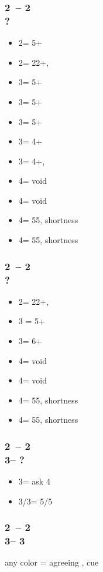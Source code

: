 \documentclass[12pt, a4paper]{article}
\begin{document}
\subsubsection*{2\clubs\ -- 2\hearts\\?}
\begin{itemize}
    \item 2\spades = 5+\spades
    \item 2\nt = 22+, \bal
    \item 3\clubs = 5+\clubs
    \item 3\diams = 5+\diams
    \item 3\hearts = 5+\hearts
    \item 3\spades = 4+\diams
    \item 3\nt = 4+\diams, \fonce
    \item 4\clubs = \hearts void
    \item 4\diams = \spades void
    \item 4\hearts = 55\minor, \hearts shortness
    \item 4\spades = 55\minor, \spades shortness
\end{itemize}

\subsubsection*{2\clubs\ -- 2\spades\\?}
\begin{itemize}
    \item 2\nt = 22+, \bal
    \item 3 = 5+
    \item 3\nt = 6+\major
    \item 4\clubs = \hearts void
    \item 4\diams = \spades void
    \item 4\hearts = 55\minor, \hearts shortness
    \item 4\spades = 55\minor, \spades shortness
\end{itemize}

\subsubsection*{2\clubs\ -- 2\\
                3\clubs -- ?}
\begin{itemize}
    \item 3\diams = ask 4\major
    \item 3\hearts/3\spades = 5\hearts/5\spades
\end{itemize}

\subsubsection*{2\clubs\ -- 2\\
                3\clubs -- 3\hearts}
any color = agreeing \hearts, cue

\end{document}
